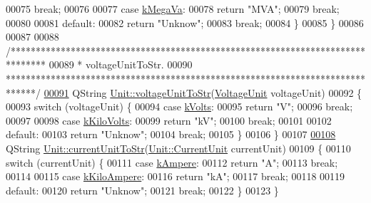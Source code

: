 \begin{DoxyCode}
00075     \textcolor{keywordflow}{break};
00076 
00077   \textcolor{keywordflow}{case} \hyperlink{class_unit_ace265ae255370ccacfd5370337572c3ba6039da0ed20f8bee64305bab8bdec365}{kMegaVa}:
00078     \textcolor{keywordflow}{return} \textcolor{stringliteral}{"MVA"};
00079     \textcolor{keywordflow}{break};
00080 
00081   \textcolor{keywordflow}{default}:
00082     \textcolor{keywordflow}{return} \textcolor{stringliteral}{"Unknow"};
00083     \textcolor{keywordflow}{break};
00084   \}
00085 \}
00086 
00087 
00088 \textcolor{comment}{/*******************************************************************************}
00089 \textcolor{comment}{ * voltageUnitToStr.}
00090 \textcolor{comment}{ ******************************************************************************/}
\hypertarget{unit_8cpp_source_l00091}{}\hyperlink{class_unit_a7fa103c31f9f069961b35b6371ff0c0a}{00091} QString \hyperlink{class_unit_a7fa103c31f9f069961b35b6371ff0c0a}{Unit::voltageUnitToStr}(\hyperlink{class_unit_a55b07dfa9457e1eca2c7194fe0cfc3c1}{VoltageUnit} voltageUnit)
00092 \{
00093   \textcolor{keywordflow}{switch} (voltageUnit) \{
00094   \textcolor{keywordflow}{case} \hyperlink{class_unit_a55b07dfa9457e1eca2c7194fe0cfc3c1aa54b2473993a702a3923525765bd6e4c}{kVolts}:
00095     \textcolor{keywordflow}{return} \textcolor{stringliteral}{"V"};
00096     \textcolor{keywordflow}{break};
00097 
00098   \textcolor{keywordflow}{case} \hyperlink{class_unit_a55b07dfa9457e1eca2c7194fe0cfc3c1a35a201a658c2cd89766787c657e9a54d}{kKiloVolts}:
00099     \textcolor{keywordflow}{return} \textcolor{stringliteral}{"kV"};
00100     \textcolor{keywordflow}{break};
00101 
00102   \textcolor{keywordflow}{default}:
00103     \textcolor{keywordflow}{return} \textcolor{stringliteral}{"Unknow"};
00104     \textcolor{keywordflow}{break};
00105   \}
00106 \}
00107 
\hypertarget{unit_8cpp_source_l00108}{}\hyperlink{class_unit_a7bd3ed3edcb18170cd162d384075b651}{00108} QString \hyperlink{class_unit_a7bd3ed3edcb18170cd162d384075b651}{Unit::currentUnitToStr}(\hyperlink{class_unit_a0794cf6c9682f48296dd4a5315389787}{Unit::CurrentUnit} currentUnit)
00109 \{
00110   \textcolor{keywordflow}{switch} (currentUnit) \{
00111   \textcolor{keywordflow}{case} \hyperlink{class_unit_a0794cf6c9682f48296dd4a5315389787a368a3c470f0b590a6100dda717a7dd4f}{kAmpere}:
00112     \textcolor{keywordflow}{return} \textcolor{stringliteral}{"A"};
00113     \textcolor{keywordflow}{break};
00114 
00115   \textcolor{keywordflow}{case} \hyperlink{class_unit_a0794cf6c9682f48296dd4a5315389787aa27cb5edd73099f24f2285e02396ae14}{kKiloAmpere}:
00116     \textcolor{keywordflow}{return} \textcolor{stringliteral}{"kA"};
00117     \textcolor{keywordflow}{break};
00118 
00119   \textcolor{keywordflow}{default}:
00120     \textcolor{keywordflow}{return} \textcolor{stringliteral}{"Unknow"};
00121     \textcolor{keywordflow}{break};
00122   \}
00123 \}
\end{DoxyCode}
